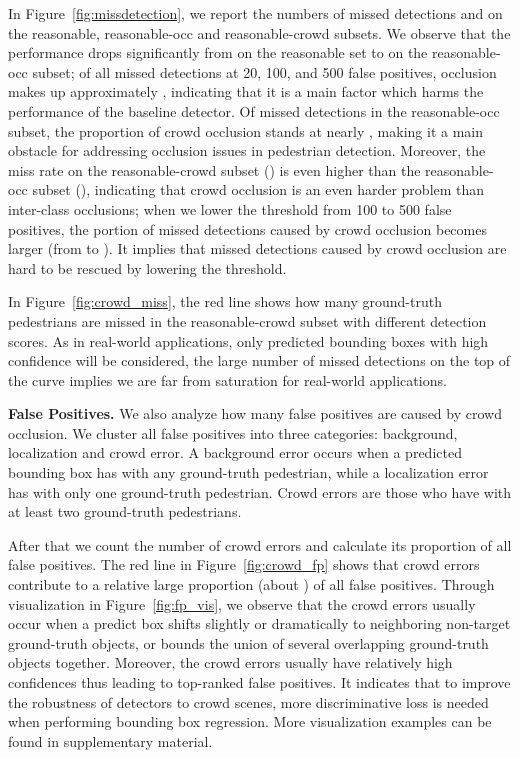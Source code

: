\documentclass[10pt,twocolumn,letterpaper]{article}
\newcommand{\myparagraph}[1]{{\vspace{0.5em} \noindent \bf #1}}
\begin{document}
In Figure~\ref{fig:missdetection}, we report the numbers of missed detections and  on the reasonable, reasonable-occ and reasonable-crowd subsets. We observe that the performance drops significantly from   on the reasonable set to   on the reasonable-occ subset; of all missed detections at 20, 100, and 500 false positives, occlusion makes up approximately , indicating that it is a main factor which harms the performance of the baseline detector. Of missed detections in the reasonable-occ subset, the proportion of crowd occlusion stands at nearly , making it a main obstacle for addressing occlusion issues in pedestrian detection. Moreover, the miss rate on the reasonable-crowd subset () is even higher than the reasonable-occ subset (), indicating that crowd occlusion is an even harder problem than inter-class occlusions; when we lower the threshold from 100 to 500 false positives, the portion of missed detections caused by crowd occlusion becomes larger (from  to ). It implies that missed detections caused by crowd occlusion are hard to be rescued by lowering the threshold.

In Figure~\ref{fig:crowd_miss}, the red line shows how many ground-truth pedestrians are missed in the reasonable-crowd subset with different detection scores. As in real-world applications, only predicted bounding boxes with high confidence will be considered, the large number of missed detections on the top of the curve implies we are far from saturation for real-world applications.

\myparagraph{False Positives.}
We also analyze how many false positives are caused by crowd occlusion. We cluster all false positives into three categories: background, localization and crowd error. A background error occurs when a predicted bounding box has  with any ground-truth pedestrian, while a localization error has  with only one ground-truth pedestrian. Crowd errors are those who have  with at least two ground-truth pedestrians.

After that we count the number of crowd errors and calculate its proportion of all false positives. The red line in Figure~\ref{fig:crowd_fp} shows that crowd errors contribute to a relative large proportion (about ) of all false positives. Through visualization in Figure~\ref{fig:fp_vis}, we observe that the crowd errors usually occur when a predict box shifts slightly or dramatically to neighboring non-target ground-truth objects, or bounds the union of several overlapping ground-truth objects together. Moreover, the crowd errors usually have relatively high confidences thus leading to top-ranked false positives. It indicates that to improve the robustness of detectors to crowd scenes, more discriminative loss is needed when performing bounding box regression. More visualization examples can be found in supplementary material.
\end{document}

